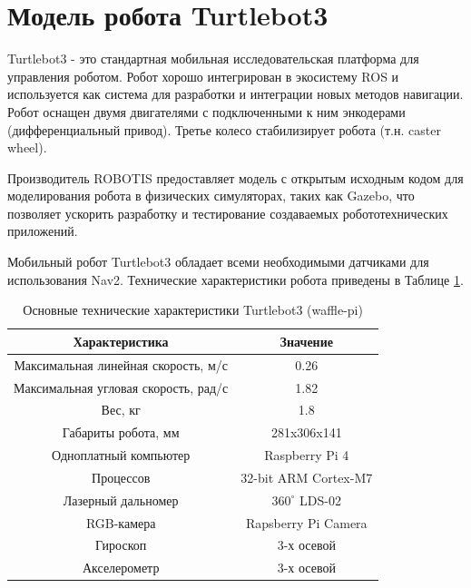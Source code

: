 \section{Модель робота Turtlebot3}

Turtlebot3 - это стандартная мобильная исследовательская платформа для управления роботом. Робот хорошо интегрирован в экосистему ROS и используется как система для разработки и интеграции новых методов навигации. Робот оснащен двумя двигателями с подключенными к ним энкодерами (дифференциальный привод). Третье колесо стабилизирует робота (т.н. caster wheel).

Производитель ROBOTIS предоставляет модель с открытым исходным кодом для моделирования робота в физических симуляторах, таких как Gazebo, что позволяет ускорить разработку и тестирование создаваемых робототехнических приложений.

Мобильный робот Turtlebot3 обладает всеми необходимыми датчиками для использования Nav2. Технические характеристики робота приведены в Таблице \ref*{tab:tb3_specs}.

\begin{table}[]
    \centering
    \begin{tabular}{|c|c|}
        \hline 
        \textbf{Характеристика} & \textbf{Значение} \\
        \hline
        Максимальная линейная скорость, м/с & 0.26 \\
        \hline
        Максимальная угловая скорость, рад/с & 1.82 \\
        \hline
        Вес, кг & 1.8 \\
        \hline
        Габариты робота, мм & 281x306x141 \\
        \hline
        Одноплатный компьютер & Raspberry Pi 4 \\
        \hline
        Процессов & 32-bit ARM Cortex-M7 \\
        \hline
        Лазерный дальномер & $360^\circ$ LDS-02 \\
        \hline
        RGB-камера & Rapsberry Pi Camera \\
        \hline
        Гироскоп & 3-х осевой\\
        \hline
        Акселерометр & 3-х осевой \\
        \hline
    \end{tabular}
    \caption{Основные технические характеристики Turtlebot3 (waffle-pi)}
    \label{tab:tb3_specs}
\end{table}


